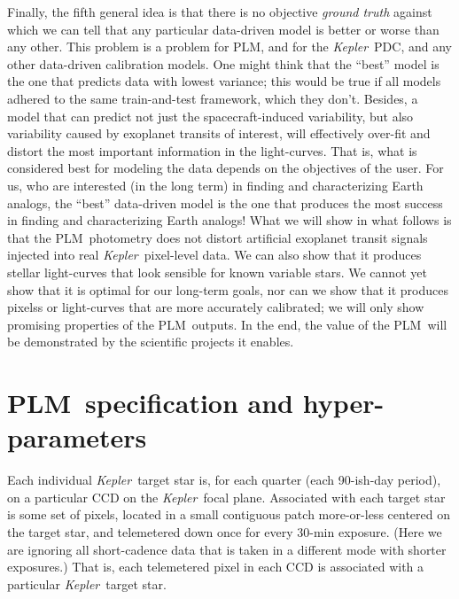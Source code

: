 \documentclass[12pt, preprint]{aastex}
\newcommand{\project}[1]{\textsl{#1}}
\newcommand{\Kepler}{\project{Kepler}}
\newcommand{\name}{PLM}
\begin{document}
Finally, the fifth general idea is that there is no objective \emph{ground truth} against which we can tell
  that any particular data-driven model is better or worse than any other.
This problem is a problem for \name, and for the \Kepler\ PDC, and any other data-driven calibration models.
One might think that the ``best'' model is the one that predicts data with lowest variance;
  this would be true if all models adhered to the same train-and-test framework, which they don't.
Besides, a model that can predict not just the spacecraft-induced variability,
  but also variability caused by exoplanet transits of interest,
  will effectively over-fit and distort the most important information in the light-curves.
That is, what is considered best for modeling the data depends on the objectives of the user.
For us, who are interested (in the long term) in finding and characterizing Earth analogs,
  the ``best'' data-driven model is the one that produces the most success in finding and characterizing Earth analogs!
What we will show in what follows is that the \name\ photometry does not distort
  artificial exoplanet transit signals injected into real \Kepler\ pixel-level data.
We can also show that it produces stellar light-curves that look sensible for known variable stars.
We cannot yet show that it is optimal for our long-term goals,
  nor can we show that it produces pixelss or light-curves that are more accurately calibrated;
  we will only show promising properties of the \name\ outputs.
In the end, the value of the \name\ will be demonstrated by the scientific projects it enables.

\section{\name\ specification and hyper-parameters}

Each individual \Kepler\ target star is, for each quarter (each 90-ish-day period),
  on a particular CCD on the \Kepler\ focal plane.
Associated with each target star is some set of pixels,
  located in a small contiguous patch more-or-less centered on the target star,
  and telemetered down once for every 30-min exposure.
(Here we are ignoring all short-cadence data that is taken in a different mode with shorter exposures.)
That is, each telemetered pixel in each CCD is associated with a particular \Kepler\ target star.
\end{document}
